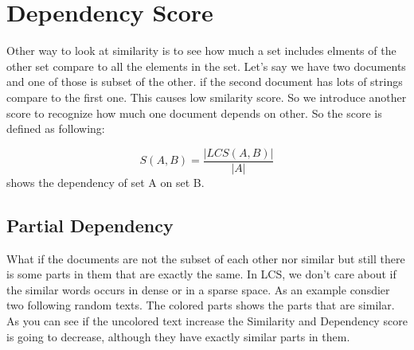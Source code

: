 \section{Dependency Score}
Other way to look at similarity is to see how much a set 
includes elments of the other set compare to all the elements
in the set. Let's say we have two documents and one of those is 
subset of the other. if the second document has lots of strings compare
to the first one. This causes low smilarity score. So we introduce another 
score to recognize how much one document depends on other. So the score
is defined as following:

\begin{equation}
\label{eq:inc-s}
  S(A,B) = \frac{|LCS(A,B)|}{|A|} 
\end{equation}
shows the dependency of set A on set B.
\subsection{Partial Dependency}
What if the documents are not the subset of each other nor similar but
still there is some parts in them that are exactly the same. In LCS, we 
don't care about if the similar words occurs in dense or in a sparse
space. As an example consdier two following random texts. The colored parts
shows the parts that are similar. As you can see if the uncolored text increase
the Similarity and Dependency score is going to decrease, although they have
exactly similar parts in them. 

